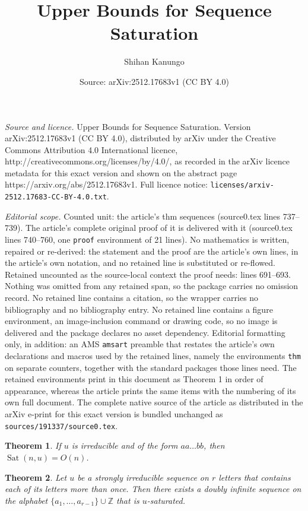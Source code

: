 \documentclass[10pt,a4paper]{amsart}
\title{Upper Bounds for Sequence Saturation}
\author{Shihan Kanungo}
\date{Source: arXiv:2512.17683v1 (CC BY 4.0)}
\newtheorem{thm}{Theorem}
\DeclareMathOperator{\Sat}{Sat}
\newcommand{\Z}{{\mathbb Z}}
\begin{document}
\maketitle

\noindent\emph{Source and licence.} Upper Bounds for Sequence Saturation. Version arXiv:2512.17683v1 (CC BY 4.0), distributed by arXiv under the Creative Commons Attribution 4.0 International licence, http://creativecommons.org/licenses/by/4.0/, as recorded in the arXiv licence metadata for this exact version and shown on the abstract page https://arxiv.org/abs/2512.17683v1. Full licence notice: \texttt{licenses/arxiv-2512.17683-CC-BY-4.0.txt}.\par\smallskip

\noindent\textit{Editorial scope.} Counted unit: the article's thm sequences (source0.tex lines 737--739). The article's complete original proof of it is delivered with it (source0.tex lines 740--760, one \texttt{proof} environment of 21 lines). No mathematics is written, repaired or re-derived: the statement and the proof are the article's own lines, in the article's own notation, and no retained line is substituted or re-flowed.  Retained uncounted as the source-local context the proof needs: lines 691--693.  Nothing was omitted from any retained span, so the package carries no omission record.  No retained line contains a citation, so the wrapper carries no bibliography and no bibliography entry.  No retained line contains a figure environment, an image-inclusion command or drawing code, so no image is delivered and the package declares no asset dependency.  Editorial formatting only, in addition: an AMS \texttt{amsart} preamble that restates the article's own declarations and macros used by the retained lines, namely the environments \texttt{thm} on separate counters, together with the standard packages those lines need.  The retained environments print in this document as Theorem 1 in order of appearance, whereas the article prints the same items with the numbering of its own full document.  The complete native source of the article as distributed in the arXiv e-print for this exact version is bundled unchanged as \texttt{sources/191337/source0.tex}.
\begin{thm}\label{thm: aa...bb}
If $u$ is irreducible and of the form $aa\dots bb$, then $\Sat(n,u)=O(n)$.
\end{thm}

\begin{thm}\label{thm: infinite sequences}
    Let $u$ be a strongly irreducible sequence on $r$ letters that contains each of its letters more than once. Then there exists a doubly infinite sequence on the alphabet $\{a_1,\dots,a_{r-1}\}\cup \Z$ that is $u$-saturated.
\end{thm}
\end{document}
